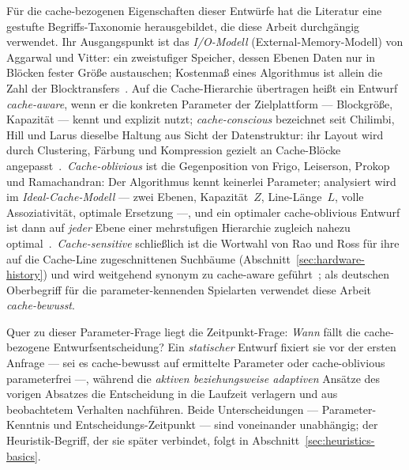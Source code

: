 Für die cache-bezogenen Eigenschaften dieser Entwürfe hat die Literatur eine gestufte
Begriffs-Taxonomie herausgebildet, die diese Arbeit durchgängig verwendet. Ihr Ausgangspunkt ist das
\emph{I/O-Modell} (External-Memory-Modell) von Aggarwal und Vitter: ein zweistufiger Speicher, dessen
Ebenen Daten nur in Blöcken fester Größe austauschen; Kostenmaß eines Algorithmus ist allein die Zahl
der Blocktransfers~\cite{aggarwal1988io}. Auf die Cache-Hierarchie übertragen heißt ein Entwurf
\emph{cache-aware}, wenn er die konkreten Parameter der Zielplattform --- Blockgröße, Kapazität ---
kennt und explizit nutzt; \emph{cache-conscious} bezeichnet seit Chilimbi, Hill und Larus dieselbe
Haltung aus Sicht der Datenstruktur: ihr Layout wird durch Clustering, Färbung und Kompression gezielt
an Cache-Blöcke angepasst~\cite{chilimbi1999layout}.\ \emph{Cache-oblivious} ist die Gegenposition von
Frigo, Leiserson, Prokop und Ramachandran: Der Algorithmus kennt keinerlei Parameter; analysiert wird
im \emph{Ideal-Cache-Modell} --- zwei Ebenen, Kapazität~$Z$, Line-Länge~$L$, volle Assoziativität,
optimale Ersetzung ---, und ein optimaler cache-oblivious Entwurf ist dann auf \emph{jeder} Ebene
einer mehrstufigen Hierarchie zugleich nahezu optimal~\cite{frigo1999cache}.\ \emph{Cache-sensitive}
schließlich ist die Wortwahl von Rao und Ross für ihre auf die Cache-Line zugeschnittenen Suchbäume
(Abschnitt~\ref{sec:hardware-history}) und wird weitgehend synonym zu cache-aware
geführt~\cite{rao1999css,rao2000csb}; als deutschen Oberbegriff für die parameter-kennenden Spielarten
verwendet diese Arbeit \emph{cache-bewusst}.

Quer zu dieser Parameter-Frage liegt die Zeitpunkt-Frage: \emph{Wann} fällt die cache-bezogene
Entwurfsentscheidung? Ein \emph{statischer} Entwurf fixiert sie vor der ersten Anfrage ---
sei es cache-bewusst auf ermittelte Parameter oder cache-oblivious parameterfrei ---, während die
\emph{aktiven beziehungsweise adaptiven} Ansätze des vorigen Absatzes die Entscheidung in die Laufzeit
verlagern und aus beobachtetem Verhalten nachführen. Beide Unterscheidungen --- Parameter-Kenntnis und
Entscheidungs-Zeitpunkt --- sind voneinander unabhängig; der Heuristik-Begriff, der sie später
verbindet, folgt in Abschnitt~\ref{sec:heuristics-basics}.

